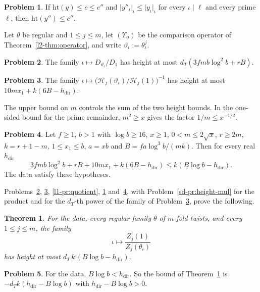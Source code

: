 \documentclass[reqno]{amsart}
\theoremstyle{definition}
\newtheorem{problem}{Problem}[section]
\theoremstyle{plain}
\newtheorem{theorem}{Theorem}[section]
\newcommand{\Hc}{{\mathcal{H}}}
\newcommand{\hdir}{h_{\mathrm{dir}}}
\begin{document}
\begin{problem}\label{pr:height-ops}
If \(\mathrm{ht}(y) \le c \le c''\) and \(\lvert y''_\iota\rvert_\iota \le \lvert y_\iota\rvert_\iota\) for every \(\iota \mid \ell\) and every prime \(\ell\), then \(\mathrm{ht}(y'') \le c''\).
\end{problem}

Let \(\theta\) be regular and \(1 \le j \le m\), let \((\Upsilon_\vartheta)\) be the comparison operator of Theorem~\ref{l2-thm:operator}, and write \(\vartheta_\iota := \theta_\iota^j\).

\begin{problem}\label{pr:delta-height}
The family \(\iota \mapsto D_{\vartheta_\iota}/D_1\) has height at most \(d_T(3fmb\log^2 b + rB)\).
\end{problem}

\begin{problem}\label{pr:hecke-height}
The family \(\iota \mapsto \bigl(\Hc_j(\vartheta_\iota)/\Hc_j(1)\bigr)^{-1}\) has height at most \(10mx_1 + k(6B - \hdir)\).
\end{problem}

The upper bound on \(m\) controls the sum of the two height bounds.  In the one-sided bound for the prime remainder, \(m^2 \ge x\) gives the factor \(1/m \le x^{-1/2}\).

\begin{problem}\label{pr:budget}
Let \(f \ge 1\), \(b > 1\) with \(\log b \ge 16\), \(x \ge 1\), \(0 < m \le 2\sqrt x\), \(r \ge 2m\), \(k = r + 1 - m\), \(1 \le x_1 \le b\), \(a = xb\) and \(B = fa\log^3 b/(mk)\).  Then for every real \(\hdir\)
\[
  3fmb\log^2 b + rB + 10mx_1 + k(6B - \hdir) \le k(B\log b - \hdir) .
\]
The data satisfy these hypotheses.
\end{problem}

Problems~\ref{pr:delta-height}, \ref{pr:hecke-height}, \ref{l1-pr:quotient}, \ref{pr:height-ops} and~\ref{pr:budget}, with Problem~\ref{sd-pr:height-mul} for the product and for the \(d_T\)-th power of the family of Problem~\ref{pr:hecke-height}, prove the following.

\begin{theorem}\label{thm:main}
For the data, every regular family \(\theta\) of \(m\)-fold twists, and every \(1 \le j \le m\), the family
\[
  \iota \longmapsto \frac{Z_j(1)}{Z_j(\theta_\iota)}
\]
has height at most \(d_T\, k\,(B\log b - \hdir)\).
\end{theorem}

\begin{problem}\label{pr:negative}
For the data, \(B\log b < \hdir\).  So the bound of Theorem~\ref{thm:main} is \(-d_Tk(\hdir - B\log b)\) with \(\hdir - B\log b > 0\).
\end{problem}
\end{document}
